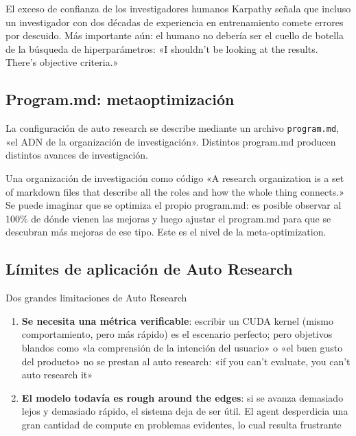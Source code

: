 \documentclass[a4paper]{article}
\begin{document}
\begin{warningbox}{El exceso de confianza de los investigadores humanos}
Karpathy señala que incluso un investigador con dos décadas de experiencia en entrenamiento comete errores por descuido. Más importante aún: el humano no debería ser el cuello de botella de la búsqueda de hiperparámetros: «I shouldn't be looking at the results. There's objective criteria.»
\end{warningbox}

\subsection{Program.md: metaoptimización}

La configuración de auto research se describe mediante un archivo \texttt{program.md}, «el ADN de la organización de investigación». Distintos program.md producen distintos avances de investigación.

\begin{importantbox}{Una organización de investigación como código}
«A research organization is a set of markdown files that describe all the roles and how the whole thing connects.» Se puede imaginar que se optimiza el propio program.md: es posible observar al 100\% de dónde vienen las mejoras y luego ajustar el program.md para que se descubran más mejoras de ese tipo. Este es el nivel de la meta-optimization.
\end{importantbox}

\subsection{Límites de aplicación de Auto Research}

\begin{warningbox}{Dos grandes limitaciones de Auto Research}
\begin{enumerate}
    \item \textbf{Se necesita una métrica verificable}: escribir un CUDA kernel (mismo comportamiento, pero más rápido) es el escenario perfecto; pero objetivos blandos como «la comprensión de la intención del usuario» o «el buen gusto del producto» no se prestan al auto research: «if you can't evaluate, you can't auto research it»
    \item \textbf{El modelo todavía es rough around the edges}: si se avanza demasiado lejos y demasiado rápido, el sistema deja de ser útil. El agent desperdicia una gran cantidad de compute en problemas evidentes, lo cual resulta frustrante
\end{enumerate}
\end{warningbox}
\end{document}
